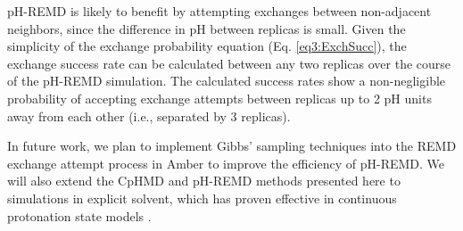 pH-REMD is likely to benefit by attempting exchanges between non-adjacent
neighbors, since the difference in pH between replicas is small.  Given the
simplicity of the exchange probability equation (Eq. \ref{eq3:ExchSucc}), the
exchange success rate can be calculated between any two replicas over the course
of the pH-REMD simulation.  The calculated success rates show a non-negligible
probability of accepting exchange attempts between replicas up to 2 pH units
away from each other (i.e., separated by 3 replicas).

In future work, we plan to implement Gibbs' sampling techniques
\cite{Chodera2011} into the REMD exchange attempt process in Amber to improve
the efficiency of pH-REMD.  We will also extend the CpHMD and pH-REMD methods
presented here to simulations in explicit solvent, which has proven effective in
continuous protonation state models \cite{Wallace2011}.
